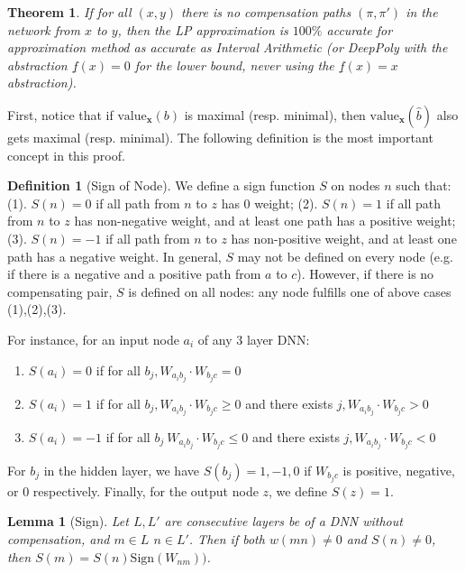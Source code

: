 \documentclass[]{article}
\newtheorem{theorem}{Theorem}
\newtheorem{lemma}{Lemma}
\theoremstyle{definition}
\newtheorem{definition}{Definition}
\newcommand{\Val}{\mathrm{value}}
\begin{document}
\begin{theorem}
	\label{th1}
	If for all $(x,y)$ there is no compensation paths $(\pi,\pi')$ 
	in the network from $x$ to $y$, then the LP approximation is 
	$100\%$ accurate for approximation method as accurate as Interval Arithmetic (or DeepPoly with the abstraction $\underline{f}(x) = 0$ for the lower bound, never using the $\underline{f}(x) = x$ abstraction). 
\end{theorem}



First, notice that if $\Val_{\boldsymbol{x}}(b)$ is maximal (resp. minimal), 
then $\Val_{\boldsymbol{x}}(\hat{b})$ also gets maximal (resp. minimal).
The following definition is the most important concept in this proof.

\begin{definition}[Sign of Node]\label{sign_of_nodes}
	We define a sign function $S$ on nodes $n$ such that: 	(1). $S(n)=0$ if all path from $n$ to $z$ has 0 weight; (2). $S(n)=1$ if all path from $n$ to $z$ has non-negative weight, and at least one path has a positive weight; (3). $S(n)=-1$ if all path from $n$ to $z$ has non-positive weight, and at least one path has a negative weight. 
	In general, $S$ may not be defined on every node (e.g. if there is a negative and a positive path from $a$ to $c$). However, if there is no compensating pair, $S$ is defined on all nodes: any node fulfills one of above cases (1),(2),(3).


	For instance, for an input node $a_i$ of any 3 layer DNN:
	\begin{enumerate}
      \item  $S(a_i)=0$ if 
	  for all $b_j, W_{a_i b_j}\cdot W_{b_j c} = 0$
	
	
	 \item  $S(a_i)=1$ if for all $b_j, W_{a_i b_j}\cdot W_{b_j c} \geq 0$ and there exists 
	 $j, W_{a_i b_j}\cdot W_{b_j c} > 0$
	
	\item $S(a_i)=-1$ if for all $b_j\ W_{a_i b_j}\cdot W_{b_j c} \leq 0$ and there exists 
	$j, W_{a_i b_j}\cdot W_{b_j c} < 0$ 
\end{enumerate}

For $b_j$ in the hidden layer, we have $S(b_j)=1,-1,0$ if $W_{b_j c}$ is positive, negative, or 0 respectively. Finally, for the output node $z$, we define $S(z)=1$.
\end{definition}


\begin{lemma}[Sign]
	\label{lemma1}
Let $L,L'$  are consecutive layers be of a DNN without compensation, and $m\in L$ $n\in L'$. 
Then if both 
$w(m n) \neq 0$ and $S(n) \neq 0$, then 
	$S(m)=S(n)\mathrm{Sign}(W_{n m}))$.
\end{lemma}
\end{document}
